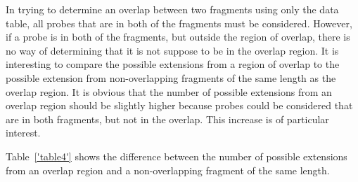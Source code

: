 

In trying to determine an overlap between two fragments using only the data
table, all probes that are in both of the fragments must be considered.
However, if a probe is in both of the fragments, but outside the region of
overlap, there is no way of determining that it is not suppose to be in the
overlap region.  It is interesting to compare the possible extensions
from a region of overlap to the possible extension from
non-overlapping fragments of the same length as the overlap region.  It is
obvious that the number of possible extensions from an overlap region should
be slightly higher
because probes could be considered that are in both fragments, but not in
the overlap.  This increase
is of particular interest.

Table~\ref{'table4'} shows the difference
between the number of possible extensions
from an overlap region and a non-overlapping fragment of the same
length.



